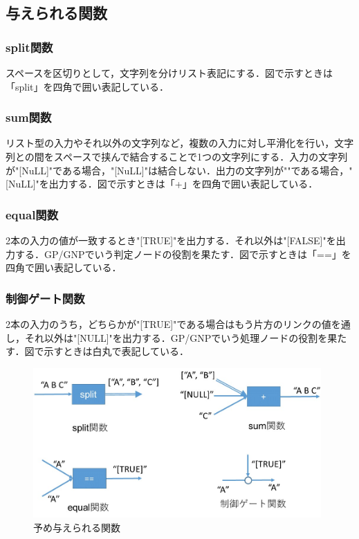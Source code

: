\documentclass[exploratorypaper]{jsaiart} %
\begin{document}
\subsection{与えられる関数}
\subsubsection{split関数}
スペースを区切りとして，文字列を分けリスト表記にする．図で示すときは「split」を四角で囲い表記している．


\subsubsection{sum関数}
リスト型の入力やそれ以外の文字列など，複数の入力に対し平滑化を行い，文字列との間をスペースで挟んで結合することで1つの文字列にする．入力の文字列が"[NuLL]"である場合，"[NuLL]"は結合しない．出力の文字列が""である場合，"[NuLL]"を出力する．図で示すときは「+」を四角で囲い表記している．

\subsubsection{equal関数}
2本の入力の値が一致するとき"[TRUE]"を出力する．それ以外は"[FALSE]"を出力する．GP/GNPでいう判定ノードの役割を果たす．図で示すときは「==」を四角で囲い表記している．

\subsubsection{制御ゲート関数}
2本の入力のうち，どちらかが"[TRUE]"である場合はもう片方のリンクの値を通し，それ以外は"[NULL]"を出力する．GP/GNPでいう処理ノードの役割を果たす．図で示すときは白丸で表記している．

\begin{figure}[t]
    \begin{center}
        \includegraphics[width=110mm]{func.jpg}
    \end{center}
    \capwidth=90mm %
    \caption{予め与えられる関数}
    \label{fig:func}
\end{figure}
\end{document}
